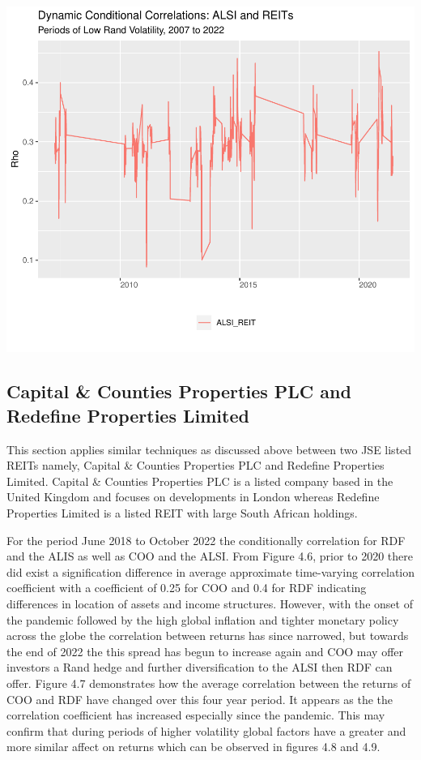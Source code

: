 \documentclass[11pt,preprint, authoryear]{elsarticle}
\let\origfigure\figure
\let\endorigfigure\endfigure
\renewenvironment{figure}[1][2] {
    \expandafter\origfigure\expandafter[H]
} {
    \endorigfigure
}
\numberwithin{equation}{section}
\numberwithin{figure}{section}
\numberwithin{table}{section}
\begin{document}
\begin{figure}
\centering
\includegraphics{Fin_Metrics_Project_files/figure-latex/unnamed-chunk-14-1.pdf}
\caption{Dynamic Conditional Correlations Graph}
\end{figure}

\hypertarget{capital-counties-properties-plc-and-redefine-properties-limited}{%
\subsection{Capital \& Counties Properties PLC and Redefine Properties
Limited}\label{capital-counties-properties-plc-and-redefine-properties-limited}}

This section applies similar techniques as discussed above between two
JSE listed REITs namely, Capital \& Counties Properties PLC and Redefine
Properties Limited. Capital \& Counties Properties PLC is a listed
company based in the United Kingdom and focuses on developments in
London whereas Redefine Properties Limited is a listed REIT with large
South African holdings.

For the period June 2018 to October 2022 the conditionally correlation
for RDF and the ALIS as well as COO and the ALSI. From Figure 4.6, prior
to 2020 there did exist a signification difference in average
approximate time-varying correlation coefficient with a coefficient of
0.25 for COO and 0.4 for RDF indicating differences in location of
assets and income structures. However, with the onset of the pandemic
followed by the high global inflation and tighter monetary policy across
the globe the correlation between returns has since narrowed, but
towards the end of 2022 the this spread has begun to increase again and
COO may offer investors a Rand hedge and further diversification to the
ALSI then RDF can offer. Figure 4.7 demonstrates how the average
correlation between the returns of COO and RDF have changed over this
four year period. It appears as the the correlation coefficient has
increased especially since the pandemic. This may confirm that during
periods of higher volatility global factors have a greater and more
similar affect on returns which can be observed in figures 4.8 and 4.9.
\end{document}
